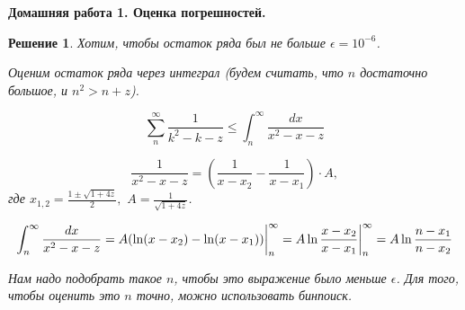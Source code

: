 \documentclass[12pt,fleqn,a4paper]{article}
\newtheorem*{solution}{Решение}
\newenvironment{task}[2] {
	\noindent\fbox{\bf {#1} {#2}.}
}{
}
\newcommand{\mytitle}[2] {
	\begin{center}
		\bf {#1} {#2}.
	\end{center}
}
\begin{document}
	\mytitle{Домашняя работа 1.}{Оценка погрешностей}
	
	\begin{task}{}{1}
	\end{task}
	\begin{solution}
	Хотим, чтобы остаток ряда был не больше $\epsilon = 10^{-6}$.
	
	Оценим остаток ряда через интеграл (будем считать, что $n$ достаточно большое, и $n^2 > n + z$).
	
	$$\sum_{n}^{\infty} \frac{1}{k^2 - k - z} \le \int_{n}^{\infty} \frac{dx}{x^2 - x - z}$$
	
	$$\frac{1}{x^2 - x - z} = (\frac{1}{x - x_2} - \frac{1}{x - x_1}) \cdot A,$$ где $x_{1, 2} = \frac{1 \pm \sqrt{1 + 4z}}{2}, \,\,  A = \frac{1}{\sqrt{1 + 4z}}$.

    $$ \int_{n}^{\infty} \frac{dx}{x^2 - x - z} = A( \ln (x - x_2) - \ln(x - x_1)) \bigg{|}_{n}^{\infty} = A \ln \frac{x - x_2}{x - x_1} \bigg{|}_{n}^{\infty} = A \ln \frac{n - x_1}{n - x_2}$$
    
    Нам надо подобрать такое $n$, чтобы это выражение было меньше $\epsilon$. Для того, чтобы оценить это $n$ точно, можно использовать бинпоиск.
    
    
	\end{solution}
	
	
	
	
\end{document}
